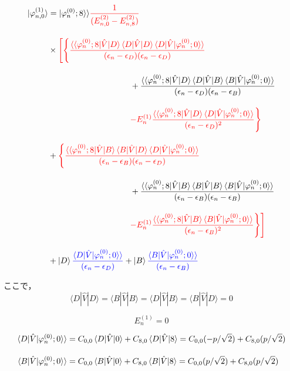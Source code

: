 \begin{align}
    \ket{\varphi_{n,0}^{(1)}}
    &=
    |\varphi^{(0)}_n;8\rangle\rangle
    \textcolor{red}{\frac{1}{(E^{(2)}_{n,0}-E^{(2)}_{n,8})}}\nn[10pt]
    &\times
    \textcolor{red}{\Biggl[\Biggl\{
    \frac{\langle\braket{\varphi^{(0)}_{n};8|\hat{V}|D}
    \langle{D|\hat{V}|D}\rangle
    \braket{D|\hat{V}|\varphi^{(0)}_n;0}\rangle}
    {(\epsilon_n-\epsilon_D)(\epsilon_n-\epsilon_D)}}\nn[10pt]
    &\hspace{100pt}
    +{\frac{\langle\braket{\varphi^{(0)}_{n};8|\hat{V}|D}
    \langle{D|\hat{V}|B}\rangle
    \braket{B|\hat{V}|\varphi^{(0)}_n;0}\rangle}
    {(\epsilon_n-\epsilon_D)(\epsilon_n-\epsilon_B)}}\nn[10pt]
    &\hspace{100pt}
    \textcolor{red}{-E^{(1)}_n
    \frac{\langle\braket{\varphi^{(0)}_{n};8|\hat{V}|D}
    \braket{D|\hat{V}|\varphi^{(0)}_n;0}\rangle}{(\epsilon_n-\epsilon_D)^2}
    \Biggr\}}
    \nn[10pt]
    &+\textcolor{red}{\Biggl\{
    \frac{\langle\braket{\varphi^{(0)}_{n};8|\hat{V}|B}
    \langle{B|\hat{V}|D}\rangle
    \braket{D|\hat{V}|\varphi^{(0)}_n;0}\rangle}
    {(\epsilon_n-\epsilon_B)(\epsilon_n-\epsilon_D)}}\nn[10pt]
    &\hspace{100pt}
    +{\frac{\langle\braket{\varphi^{(0)}_{n};8|\hat{V}|B}
    \langle{B|\hat{V}|B}\rangle
    \braket{B|\hat{V}|\varphi^{(0)}_n;0}\rangle}
    {(\epsilon_n-\epsilon_B)(\epsilon_n-\epsilon_B)}}\nn[10pt]
    &\hspace{100pt}
    \textcolor{red}{-E^{(1)}_n
    \frac{\langle\braket{\varphi^{(0)}_{n};8|\hat{V}|B}
    \braket{B|\hat{V}|\varphi^{(0)}_n;0}\rangle}{(\epsilon_n-\epsilon_B)^2}
    \Biggr\}\Biggr]}
    \nn[10pt]
    &+
    \ket{D}
    \textcolor{blue}{
    \frac{\braket{D|\hat{V}|\varphi^{(0)}_n;0}\rangle}{(\epsilon_n-\epsilon_D)}}
    +
    \ket{B}
    \textcolor{blue}{
    \frac{\braket{B|\hat{V}|\varphi^{(0)}_n;0}\rangle}{(\epsilon_n-\epsilon_B)}}
\end{align}

ここで，
\begin{equation}
    \langle{D|\hat{V}|D}\rangle
    =\langle{B|\hat{V}|B}\rangle
    =\langle{D|\hat{V}|B}\rangle
    =\langle{B|\hat{V}|D}\rangle=0
\end{equation}

\begin{equation}
    E^{(1)}_n = 0
\end{equation}

\begin{align}
    \braket{D|\hat{V}|\varphi^{(0)}_n;0}\rangle
    &=C_{0,0}\braket{D|\hat{V}|0} + C_{8,0}\braket{D|\hat{V}|8}
    =C_{0,0}(-p/\sqrt{2}) + C_{8,0} (p/\sqrt{2})\\[10pt]
    \braket{B|\hat{V}|\varphi^{(0)}_n;0}\rangle
    &=C_{0,0}\braket{B|\hat{V}|0} + C_{8,0}\braket{B|\hat{V}|8}
    =C_{0,0}(p/\sqrt{2}) + C_{8,0} (p/\sqrt{2})
\end{align}

